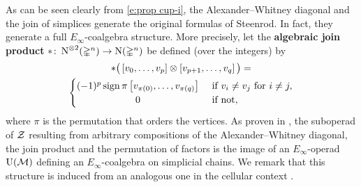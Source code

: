 As can be seen clearly from \cref{e:prop cup-i}, the Alexander--Whitney diagonal and the join of simplices generate the original formulas of Steenrod.
In fact, they generate a full $E_\infty$-coalgebra structure.
More precisely, let the \textbf{algebraic join product} $\ast \colon \operatorname{N}^{\otimes 2}(\mathbb{\Delta}^n) \to \operatorname{N}(\mathbb{\Delta}^n)$ be defined (over the integers) by
\begin{multline}
	\ast \big(\left[v_0, \dots, v_p \right] \ot \left[v_{p+1}, \dots, v_q\right]\big) =\\
	\begin{cases}
		(-1)^p \sign \pi \left[v_{\pi(0)}, \dots, v_{\pi(q)}\right] &
		\text{ if } v_i \neq v_j \text{ for } i \neq j, \\
		\hfil 0 &
		\text{ if not},
	\end{cases}
\end{multline}
where $\pi$ is the permutation that orders the vertices.
As proven in \cite{medina2020prop1}, the suboperad of $\mathcal{Z}$ resulting from arbitrary compositions of the Alexander--Whitney diagonal, the join product and the permutation of factors is the image of an $E_\infty$-operad $\operatorname{U}(\mathcal{M})$ defining an $E_\infty$-coalgebra on simplicial chains.
We remark that this structure is induced from an analogous one in the cellular context \cite{medina2021prop2}.


